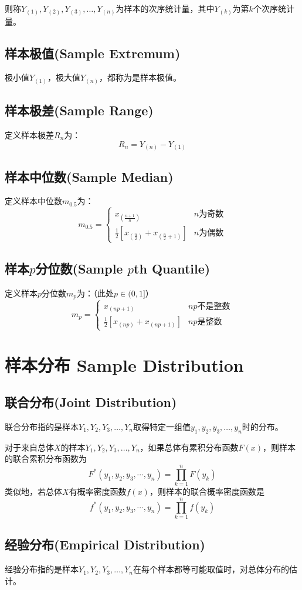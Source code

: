 \documentclass[UTF8]{ctexbook}
\begin{document}
则称$Y_{(1)},Y_{(2)},Y_{(3)},\dots,Y_{(n)}$为样本的次序统计量，其中$Y_{(k)}$为第$k$个次序统计量。
\subsection{样本极值(Sample Extremum)}
极小值$Y_{(1)}$，极大值$Y_{(n)}$，都称为是样本极值。
\subsection{样本极差(Sample Range)}
定义样本极差$R_n$为：
\[
	R_n=Y_{(n)}-Y_{(1)}
\]
\subsection{样本中位数(Sample Median)}
定义样本中位数$m_{0.5}$为：
\[
	m_{0.5}=\begin{cases}
		x_{(\frac{n+1}{n})} & n\text{为奇数} \\
		\frac{1}{2}\left[x_{(\frac{n}{2})}+x_{(\frac{n}{2}+1)}\right] & n\text{为偶数}
	\end{cases}
\]
\subsection{样本$p$分位数(Sample $p$th Quantile)}
定义样本$p$分位数$m_p$为：（此处$p\in(0,1]$）
\[
	m_{p}=\begin{cases}
		x_{(np+1)} & np\text{不是整数} \\
		\frac{1}{2}\left[x_{(np)}+x_{(np+1)}\right] & np\text{是整数}
	\end{cases}
\]
\section{样本分布 Sample Distribution}
\subsection{联合分布(Joint Distribution)}
联合分布指的是样本$Y_1, Y_2, Y_3,\dots, Y_n$取得特定一组值$y_1, y_2, y_3,\dots, y_n$时的分布。

对于来自总体$X$的样本$Y_1, Y_2, Y_3,\dots, Y_n$，如果总体有累积分布函数$F(x)$，则样本的联合累积分布函数为
\[
	F^*(y_1, y_2, y_3, \cdots, y_n)=\prod_{k=1}^nF(y_k)
\]
类似地，若总体$X$有概率密度函数$f(x)$，则样本的联合概率密度函数是
\[
f^*(y_1, y_2, y_3, \cdots, y_n)=\prod_{k=1}^nf(y_k)
\]
\subsection{经验分布(Empirical Distribution)}
经验分布指的是样本$Y_1, Y_2, Y_3,\dots, Y_n$在每个样本都等可能取值时，对总体分布的估计。
\end{document}
